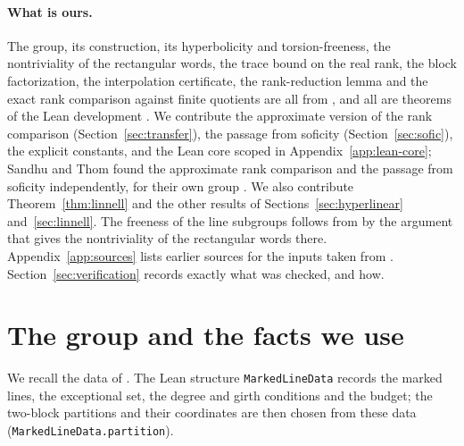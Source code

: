 \documentclass[11pt]{article}
\theoremstyle{definition}
\theoremstyle{remark}
\numberwithin{equation}{section}
\newcommand{\lean}[1]{\nolinkurl{#1}}
\begin{document}
\paragraph{What is ours.} The group, its construction, its hyperbolicity and torsion-freeness, the nontriviality of the rectangular words, the trace bound on the real rank, the block factorization, the interpolation certificate, the rank-reduction lemma and the exact rank comparison against finite quotients are all from \cite{OAI252}, and all are theorems of the Lean development \cite{OAImath}. We contribute the approximate version of the rank comparison (Section~\ref{sec:transfer}), the passage from soficity (Section~\ref{sec:sofic}), the explicit constants, and the Lean core scoped in Appendix~\ref{app:lean-core}; Sandhu and Thom found the approximate rank comparison and the passage from soficity independently, for their own group \cite[Theorem~3.1 and Section~5]{SandhuThom26}. We also contribute Theorem~\ref{thm:linnell} and the other results of Sections~\ref{sec:hyperlinear} and~\ref{sec:linnell}. The freeness of the line subgroups follows from \cite[Theorem~2.1 and Lemma~2.3]{OAI252} by the argument that gives the nontriviality of the rectangular words there. Appendix~\ref{app:sources} lists earlier sources for the inputs taken from \cite{OAI252}. Section~\ref{sec:verification} records exactly what was checked, and how.

\section{The group and the facts we use}\label{sec:group}

We recall the data of \cite[Section~2]{OAI252}. The Lean structure \lean{MarkedLineData} records the marked lines, the exceptional set, the degree and girth conditions and the budget; the two-block partitions and their coordinates are then chosen from these data (\lean{MarkedLineData.partition}).
\end{document}

